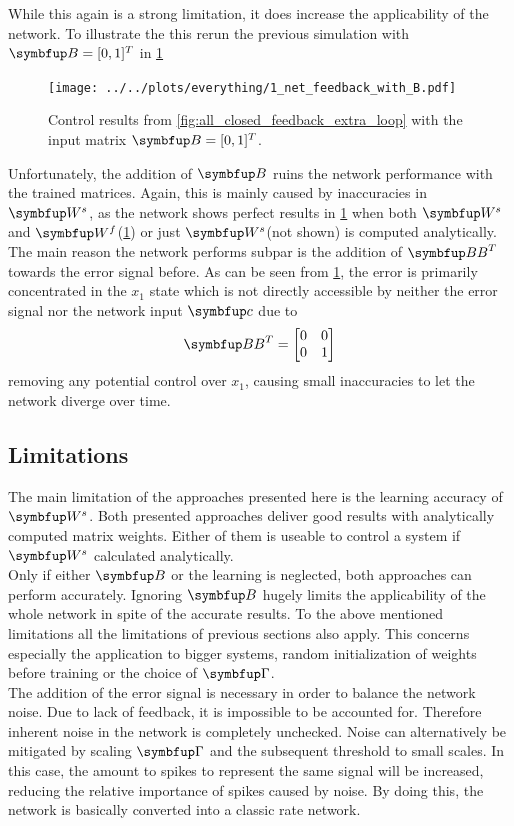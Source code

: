 While this again is a strong limitation, it does increase the applicability of the network. To illustrate the this rerun the previous simulation with $\bmu{B} = [0,1]^T$ in \cref{fig:all_closed_1_net_with_b}
\begin{figure}
	\centering
	\texttt{[image: ../../plots/everything/1\_net\_feedback\_with\_B.pdf]}
	\caption{Control results from \cref{fig:all_closed_feedback_extra_loop} with the input matrix $\bmu{B} =[0,1]^T$.}
	\label{fig:all_closed_1_net_with_b}
\end{figure}
Unfortunately, the addition of $\bmu{B}$ ruins the network performance with the trained matrices. Again, this is mainly caused by inaccuracies in $\bmu{W}^s$, as the network shows perfect results in \cref{fig:all_closed_1_net_with_b} when both $\bmu{W}^s$ and $\bmu{W}^f$(\cref{fig:all_closed_1_net_with_b}) or just $\bmu{W}^s$(not shown) is computed analytically.\\
The main reason the network performs subpar is the addition of $\bmu{BB}^T$ towards the error signal before. As can be seen from \cref{fig:all_closed_1_net_with_b}, the error is primarily concentrated in the $x_1$ state which is not directly accessible by neither the error signal nor the network input $\bmu{c}$ due to
\begin{equation}
	\bmu{BB}^T = \begin{bmatrix}
	0&0\\
	0&1\\
	\end{bmatrix}
\end{equation}
removing any potential control over $x_1$, causing small inaccuracies to let the network diverge over time.\\

\subsection{Limitations}
The main limitation of the approaches presented here is the learning accuracy of $\bmu{W}^s$.
Both presented approaches deliver good results with analytically computed matrix weights. Either of them is useable to control a system if $\bmu{W}^s$ calculated analytically.\\
Only if either $\bmu{B}$ or the learning is neglected, both approaches can perform accurately. Ignoring $\bmu{B}$ hugely limits the applicability of the whole network in spite of the accurate results. To the above mentioned limitations all the limitations of previous sections also apply. This concerns especially the application to bigger systems, random initialization of weights before training or the choice of $\bmu{\Gamma}$.\\
The addition of the error signal is necessary in order to balance the network noise. Due to lack of feedback, it is impossible to be accounted for. Therefore inherent noise in the network is completely unchecked.
Noise can alternatively be mitigated by scaling $\bmu{\Gamma}$ and the subsequent threshold to small scales. In this case, the amount to spikes to represent the same signal will be increased, reducing the relative importance of spikes caused by noise. By doing this, the network is basically converted into a classic rate network.\\
